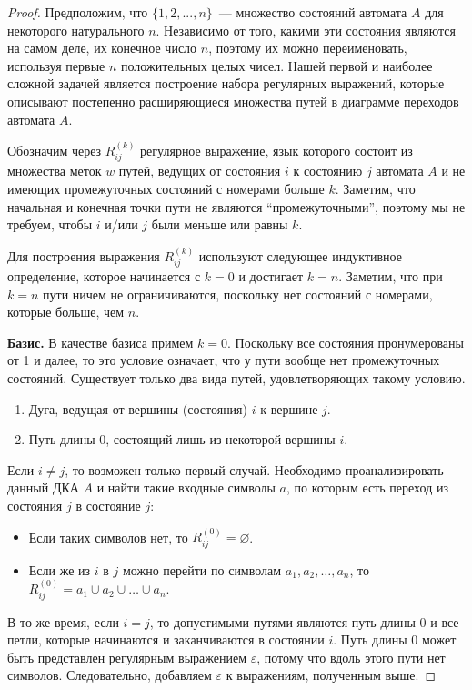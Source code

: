 \documentclass[a4paper,12pt]{article}
\begin{document}
	\begin{proof}
		Предположим, что $\{1, 2, ..., n\}$~--- множество состояний автомата $A$ для некоторого натурального $n$. Независимо от того, какими эти состояния являются на самом деле, их конечное число $n$, поэтому их можно переименовать, используя первые $n$ положительных целых чисел. Нашей первой и наиболее сложной задачей является построение набора регулярных выражений, которые описывают постепенно расширяющиеся множества путей в диаграмме переходов автомата $A$.
		
		Обозначим через $R^{(k)}_{ij}$ регулярное выражение, язык которого состоит из множества меток $w$ путей, ведущих от состояния $i$ к состоянию $j$ автомата $A$ и не имеющих промежуточных состояний с номерами больше $k$. Заметим, что начальная и конечная точки пути не являются ``промежуточными'', поэтому мы не требуем, чтобы $i$ и/или $j$ были меньше или равны $k$.
		
		Для построения выражения $R^{(k)}_{ij}$ используют следующее индуктивное определение, которое начинается с $k = 0$ и достигает $k = n$. Заметим, что при $k = n$ пути ничем не ограничиваются, поскольку нет состояний с номерами, которые больше, чем $n$.
		
		\textbf{Базис.} В качестве базиса примем $k = 0$. Поскольку все состояния пронумерованы от 1 и далее, то это условие означает, что у пути вообще нет промежуточных состояний. Существует только два вида путей, удовлетворяющих такому условию.
		\begin{enumerate}
			\item Дуга, ведущая от вершины (состояния) $i$ к вершине $j$.
			\item Путь длины 0, состоящий лишь из некоторой вершины $i$.
		\end{enumerate}
		Если $i \neq j$, то возможен только первый случай. Необходимо проанализировать данный ДКА $A$ и найти такие входные символы $a$, по которым есть переход из состояния $j$ в состояние $j$:
		\begin{itemize}
			\item Если таких символов нет, то $R^{(0)}_{ij} = \varnothing$.
			
			\item Если же из $i$ в $j$ можно перейти по символам $a_1, a_2, \ldots, a_n$, то $R^{(0)}_{ij} = a_1 \cup a_2 \cup \ldots \cup a_n$.
		\end{itemize}
		
		В то же время, если $i = j$, то допустимыми путями являются путь длины 0 и все петли, которые начинаются и заканчиваются в состоянии $i$. Путь длины 0 может быть представлен регулярным выражением $\varepsilon$, потому что вдоль этого пути нет символов. Следовательно, добавляем $\varepsilon$ к выражениям, полученным выше.
		

\end{proof}
\end{document}
